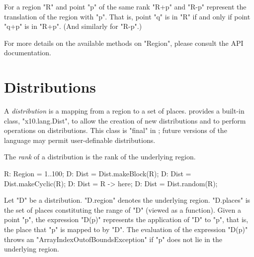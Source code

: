 For a region \xcdmath"R" and point \xcdmath"p" of the same rank 
\xcdmath"R+p" and \xcdmath"R-p" represent the translation of the region
with \xcdmath"p". That is, point \xcdmath"q" is in 
\xcdmath"R" if and only if point \xcdmath"q+p" is in \xcdmath"R+p". (And similarly
for \xcdmath"R-p".)



For more details on the available methods on \xcdmath"Region", please
consult the API documentation.


\section{Distributions}\label{XtenDistributions}

A {\em distribution} is a mapping from a region to a set of places.
{}\Xten{} provides a built-in class, \xcd"x10.lang.Dist", to allow the creation of new distributions and
to perform operations on distributions. This class is \xcd"final" in
{}\XtenCurrVer; future versions of the language may permit
user-definable distributions. 

The {\em rank} of a distribution is the rank of the underlying region.



\begin{xten}
R: Region = 1..100;
D: Dist = Dist.makeBlock(R);
D: Dist = Dist.makeCyclic(R);
D: Dist = R -> here;
D: Dist = Dist.random(R);
\end{xten}

Let \xcd"D" be a distribution. \xcd"D.region" denotes the underlying
region. \xcd"D.places" is the set of places constituting the range of
\xcd"D" (viewed as a function). Given a point \xcd"p", the expression
\xcd"D(p)" represents the application of \xcd"D" to \xcd"p", that is,
the place that \xcd"p" is mapped to by \xcd"D". The evaluation of the
expression \xcd"D(p)" throws an \xcd"ArrayIndexOutofBoundsException"
if \xcd"p" does not lie in the underlying region.


